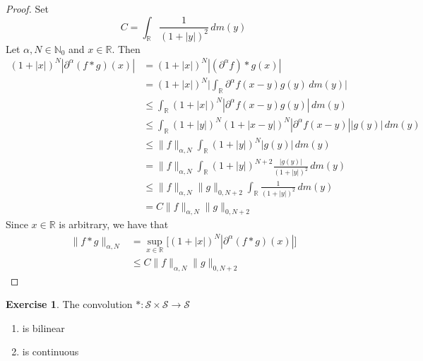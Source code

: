 \documentclass[12pt]{amsart}
\theoremstyle{definition}
\newtheorem{ex}[definition]{Exercise}
\newcommand{\p}{\partial}
\newcommand{\al}{\alpha}
\newcommand{\N}{\mathbb{N}}
\newcommand{\R}{\mathbb{R}}
\newcommand{\MS}{\mathcal{S}}
\newcommand{\dm}{\, d m}
\begin{document}
	\begin{proof}
		Set 
		$$C = \int_{\R} \frac{1}{(1+|y|)^2} \dm(y)$$
		Let $\al,N \in \N_0$ and $x \in \R$. Then 
		\begin{align*}
			(1+|x|)^N |\p^{\al} (f*g)(x)|
			& =   (1+|x|)^N |(\p^{\al}f )*g(x)| \\
			& =   (1+|x|)^N \bigg| \int_{\R}\p^{\al}f(x-y) g(y) \dm(y) \bigg|\\
			& \leq   \int_{\R}(1+|x|)^N|\p^{\al}f(x-y) g(y)| \dm(y) \\
			& \leq   \int_{\R}(1+|y|)^N(1+|x-y|)^N|\p^{\al}f(x-y)| |g(y)| \dm(y) \\
			& \leq  \|f\|_{\al, N} \int_{\R}(1+|y|)^N |g(y)| \dm(y) \\
			& =  \|f\|_{\al, N} \int_{\R}(1+|y|)^{N+2} \frac{|g(y)|}{(1+|y|)^2} \dm(y) \\
			& \leq \|f\|_{\al, N} \|g\|_{0, N+2} \int_{\R} \frac{1}{(1+|y|)^2} \dm(y) \\
			& =  C\|f\|_{\al, N} \|g\|_{0, N+2}
		\end{align*}
		Since $x \in \R$ is arbitrary, we have that 
		\begin{align*}
			\|f*g\|_{\al, N}
			& = \sup_{x \in \R} \bigg[ (1+|x|)^N |\p^{\al} (f*g)(x)| \bigg] \\
			& \leq C\|f\|_{\al, N} \|g\|_{0, N+2}
		\end{align*}
	\end{proof}

	\begin{ex}
		The convolution $*: \MS \times \MS \rightarrow \MS$ 
		\begin{enumerate}
			\item is bilinear
			\item is continuous
		\end{enumerate}
	\end{ex}
\end{document}
